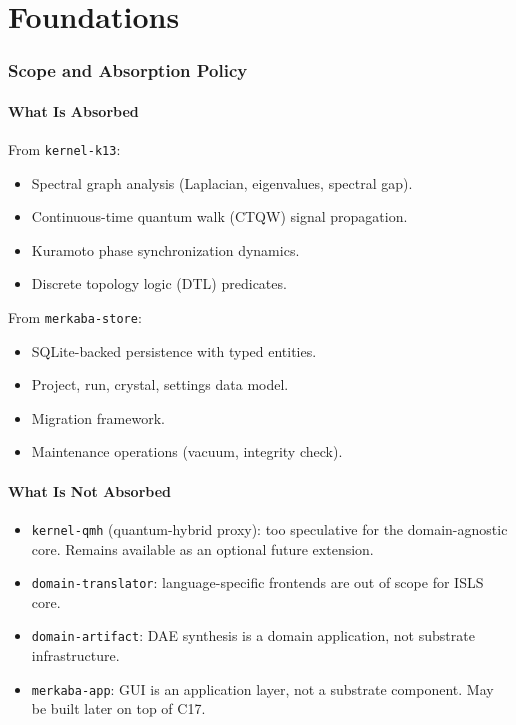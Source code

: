 \documentclass[11pt,a4paper,twoside]{article}
\theoremstyle{definition}
\theoremstyle{plain}
\theoremstyle{remark}
\newcommand{\ISLS}{\textsf{ISLS}}
\begin{document}
\part{Foundations}

\section{Scope and Absorption Policy}

\subsection{What Is Absorbed}

From \texttt{kernel-k13}:
\begin{itemize}[nosep]
  \item Spectral graph analysis (Laplacian, eigenvalues, spectral gap).
  \item Continuous-time quantum walk (CTQW) signal propagation.
  \item Kuramoto phase synchronization dynamics.
  \item Discrete topology logic (DTL) predicates.
\end{itemize}

From \texttt{merkaba-store}:
\begin{itemize}[nosep]
  \item SQLite-backed persistence with typed entities.
  \item Project, run, crystal, settings data model.
  \item Migration framework.
  \item Maintenance operations (vacuum, integrity check).
\end{itemize}

\subsection{What Is Not Absorbed}

\begin{itemize}[nosep]
  \item \texttt{kernel-qmh} (quantum-hybrid proxy): too speculative for
        the domain-agnostic core. Remains available as an optional
        future extension.
  \item \texttt{domain-translator}: language-specific frontends are out
        of scope for \ISLS{} core.
  \item \texttt{domain-artifact}: DAE synthesis is a domain application,
        not substrate infrastructure.
  \item \texttt{merkaba-app}: GUI is an application layer, not a
        substrate component. May be built later on top of C17.
\end{itemize}
\end{document}
